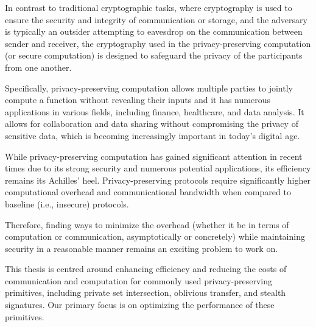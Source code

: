 
In contrast to traditional cryptographic tasks, where cryptography is used to ensure the security and integrity of communication or storage, and the adversary is typically an outsider attempting to eavesdrop on the communication between sender and receiver, the cryptography used in the privacy-preserving computation (or secure computation) is designed to safeguard the privacy of the participants from one another.

Specifically, privacy-preserving computation allows multiple parties to jointly compute a function without revealing their inputs and it has numerous applications in various fields, including finance, healthcare, and data analysis. It allows for collaboration and data sharing without compromising the privacy of sensitive data, which is becoming increasingly important in today's digital age.

While privacy-preserving computation has gained significant attention in recent times due to its strong security and numerous potential applications, its efficiency remains its Achilles' heel. Privacy-preserving protocols require significantly higher computational overhead and communicational bandwidth when compared to baseline (i.e., insecure) protocols.

Therefore, finding ways to minimize the overhead (whether it be in terms of computation or communication, asymptotically or concretely) while maintaining security in a reasonable manner remains an exciting problem to work on.

This thesis is centred around enhancing efficiency and reducing the costs of communication and computation for commonly used privacy-preserving primitives, including private set intersection, oblivious transfer, and stealth signatures. Our primary focus is on optimizing the performance of these primitives. 